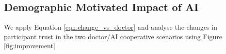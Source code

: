 \documentclass[manuscript,screen,review]{acmart}
\begin{document}













\subsection{Demographic Motivated Impact of AI}











We apply Equation \ref{eqn:change_vs_doctor} and analyse the changes in participant trust in the two doctor/AI cooperative scenarios using Figure \ref{fig:improvement}.
\end{document}
